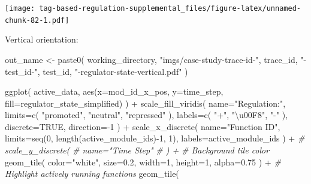 \documentclass[
]{book}
\newenvironment{Shaded}{\begin{snugshade}}{\end{snugshade}}
\newcommand{\AttributeTok}[1]{\textcolor[rgb]{0.77,0.63,0.00}{#1}}
\newcommand{\CommentTok}[1]{\textcolor[rgb]{0.56,0.35,0.01}{\textit{#1}}}
\newcommand{\ConstantTok}[1]{\textcolor[rgb]{0.00,0.00,0.00}{#1}}
\newcommand{\DecValTok}[1]{\textcolor[rgb]{0.00,0.00,0.81}{#1}}
\newcommand{\FloatTok}[1]{\textcolor[rgb]{0.00,0.00,0.81}{#1}}
\newcommand{\FunctionTok}[1]{\textcolor[rgb]{0.00,0.00,0.00}{#1}}
\newcommand{\NormalTok}[1]{#1}
\newcommand{\OtherTok}[1]{\textcolor[rgb]{0.56,0.35,0.01}{#1}}
\newcommand{\SpecialCharTok}[1]{\textcolor[rgb]{0.00,0.00,0.00}{#1}}
\newcommand{\StringTok}[1]{\textcolor[rgb]{0.31,0.60,0.02}{#1}}
\begin{document}
\texttt{[image: tag-based-regulation-supplemental\_files/figure-latex/unnamed-chunk-82-1.pdf]}

Vertical orientation:

\begin{Shaded}
\begin{Highlighting}[]
\NormalTok{out\_name }\OtherTok{\textless{}{-}} \FunctionTok{paste0}\NormalTok{(}
\NormalTok{  working\_directory,}
  \StringTok{"imgs/case{-}study{-}trace{-}id{-}"}\NormalTok{,}
\NormalTok{   trace\_id,}
   \StringTok{"{-}test\_id{-}"}\NormalTok{,}
\NormalTok{   test\_id,}
   \StringTok{"{-}regulator{-}state{-}vertical.pdf"}
\NormalTok{)}

\FunctionTok{ggplot}\NormalTok{(}
\NormalTok{    active\_data,}
    \FunctionTok{aes}\NormalTok{(}\AttributeTok{x=}\NormalTok{mod\_id\_x\_pos, }\AttributeTok{y=}\NormalTok{time\_step, }\AttributeTok{fill=}\NormalTok{regulator\_state\_simplified)}
\NormalTok{  ) }\SpecialCharTok{+}
  \FunctionTok{scale\_fill\_viridis}\NormalTok{(}
    \AttributeTok{name=}\StringTok{"Regulation:"}\NormalTok{,}
    \AttributeTok{limits=}\FunctionTok{c}\NormalTok{(}
      \StringTok{"promoted"}\NormalTok{,}
      \StringTok{"neutral"}\NormalTok{,}
      \StringTok{"repressed"}
\NormalTok{    ),}
    \AttributeTok{labels=}\FunctionTok{c}\NormalTok{(}
      \StringTok{"+"}\NormalTok{,}
      \StringTok{"\textbackslash{}u00F8"}\NormalTok{,}
      \StringTok{"{-}"}
\NormalTok{    ),}
    \AttributeTok{discrete=}\ConstantTok{TRUE}\NormalTok{,}
    \AttributeTok{direction=}\SpecialCharTok{{-}}\DecValTok{1}
\NormalTok{  ) }\SpecialCharTok{+}
  \FunctionTok{scale\_x\_discrete}\NormalTok{(}
    \AttributeTok{name=}\StringTok{"Function ID"}\NormalTok{,}
    \AttributeTok{limits=}\FunctionTok{seq}\NormalTok{(}\DecValTok{0}\NormalTok{, }\FunctionTok{length}\NormalTok{(active\_module\_ids)}\SpecialCharTok{{-}}\DecValTok{1}\NormalTok{, }\DecValTok{1}\NormalTok{),}
    \AttributeTok{labels=}\NormalTok{active\_module\_ids}
\NormalTok{  ) }\SpecialCharTok{+}
  \CommentTok{\# scale\_y\_discrete(}
  \CommentTok{\#   name="Time Step"}
  \CommentTok{\# ) +}
  \CommentTok{\# Background tile color}
  \FunctionTok{geom\_tile}\NormalTok{(}
    \AttributeTok{color=}\StringTok{"white"}\NormalTok{,}
    \AttributeTok{size=}\FloatTok{0.2}\NormalTok{,}
    \AttributeTok{width=}\DecValTok{1}\NormalTok{,}
    \AttributeTok{height=}\DecValTok{1}\NormalTok{,}
    \AttributeTok{alpha=}\FloatTok{0.75}
\NormalTok{  ) }\SpecialCharTok{+}
  \CommentTok{\# Highlight actively running functions}
  \FunctionTok{geom\_tile}\NormalTok{(}

\end{Highlighting}
\end{Shaded}
\end{document}
